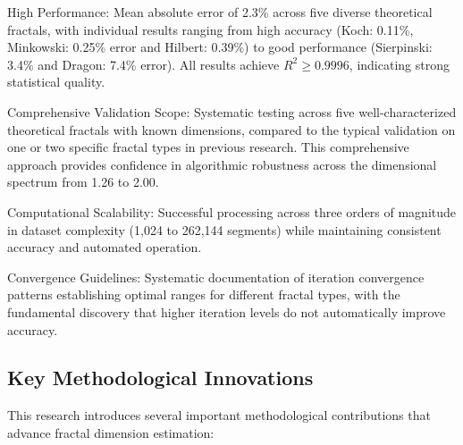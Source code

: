 \documentclass[preprint,12pt]{elsarticle}
\def\textbf#1{#1}%
\begin{document}
\textbf{High Performance}: Mean absolute error of 2.3\% across five diverse theoretical fractals, with individual results ranging from high accuracy (Koch: 0.11\%, Minkowski: 0.25\% error and Hilbert: 0.39\%) to good performance (Sierpinski: 3.4\% and Dragon: 7.4\% error). All results achieve $R^2 \geq 0.9996$, indicating strong statistical quality.

\textbf{Comprehensive Validation Scope}: Systematic testing across five well-characterized theoretical fractals with known dimensions, compared to the typical validation on one or two specific fractal types in previous research. This comprehensive approach provides confidence in algorithmic robustness across the dimensional spectrum from 1.26 to 2.00.

\textbf{Computational Scalability}: Successful processing across three orders of magnitude in dataset complexity (1,024 to 262,144 segments) while maintaining consistent accuracy and automated operation.

\textbf{Convergence Guidelines}: Systematic documentation of iteration convergence patterns establishing optimal ranges for different fractal types, with the fundamental discovery that higher iteration levels do not automatically improve accuracy.

\subsection{Key Methodological Innovations}

This research introduces several important methodological contributions that advance fractal dimension estimation:
\end{document}
